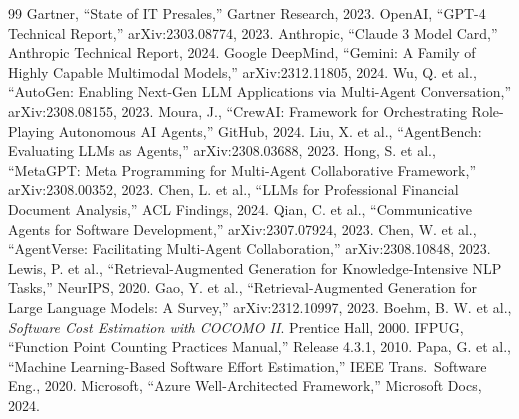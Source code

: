 \documentclass[10pt,twocolumn]{article}
\begin{document}
\begin{thebibliography}{99}
\small
{} Gartner, ``State of IT Presales,'' Gartner Research, 2023.
 OpenAI, ``GPT-4 Technical Report,'' arXiv:2303.08774, 2023.
 Anthropic, ``Claude 3 Model Card,'' Anthropic Technical Report, 2024.
 Google DeepMind, ``Gemini: A Family of Highly Capable Multimodal Models,'' arXiv:2312.11805, 2024.
 Wu, Q. et al., ``AutoGen: Enabling Next-Gen LLM Applications via Multi-Agent Conversation,'' arXiv:2308.08155, 2023.
 Moura, J., ``CrewAI: Framework for Orchestrating Role-Playing Autonomous AI Agents,'' GitHub, 2024.
 Liu, X. et al., ``AgentBench: Evaluating LLMs as Agents,'' arXiv:2308.03688, 2023.
 Hong, S. et al., ``MetaGPT: Meta Programming for Multi-Agent Collaborative Framework,'' arXiv:2308.00352, 2023.
 Chen, L. et al., ``LLMs for Professional Financial Document Analysis,'' ACL Findings, 2024.
 Qian, C. et al., ``Communicative Agents for Software Development,'' arXiv:2307.07924, 2023.
 Chen, W. et al., ``AgentVerse: Facilitating Multi-Agent Collaboration,'' arXiv:2308.10848, 2023.
 Lewis, P. et al., ``Retrieval-Augmented Generation for Knowledge-Intensive NLP Tasks,'' NeurIPS, 2020.
 Gao, Y. et al., ``Retrieval-Augmented Generation for Large Language Models: A Survey,'' arXiv:2312.10997, 2023.
 Boehm, B. W. et al., \textit{Software Cost Estimation with COCOMO II}. Prentice Hall, 2000.
 IFPUG, ``Function Point Counting Practices Manual,'' Release 4.3.1, 2010.
 Papa, G. et al., ``Machine Learning-Based Software Effort Estimation,'' IEEE Trans.\ Software Eng., 2020.
 Microsoft, ``Azure Well-Architected Framework,'' Microsoft Docs, 2024.
\end{thebibliography}
\end{document}
